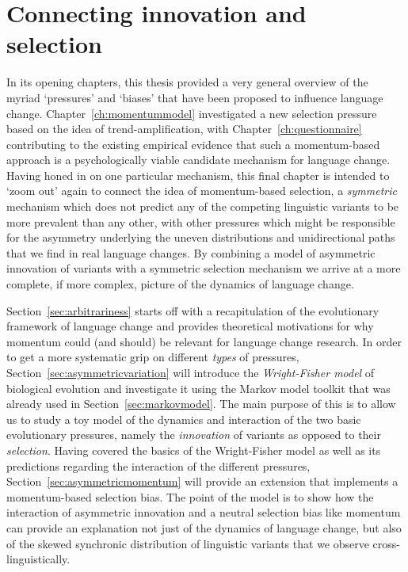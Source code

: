\section{Connecting innovation and selection}

In its opening chapters, this thesis provided a very general overview of the myriad `pressures' and `biases' that have been proposed to influence language change. Chapter~\ref{ch:momentummodel} investigated a new selection pressure based on the idea of trend-amplification, with Chapter~\ref{ch:questionnaire} contributing to the existing empirical evidence that such a momentum-based approach is a psychologically viable candidate mechanism for language change.
Having honed in on one particular mechanism, this final chapter is intended to `zoom out' again to connect the idea of momentum-based selection, a \emph{symmetric} mechanism which does not predict any of the competing linguistic variants to be more prevalent than any other, with other pressures which might be responsible for the asymmetry underlying the uneven distributions and unidirectional paths that we find in real language changes. By combining a model of asymmetric innovation of variants with a symmetric selection mechanism we arrive at a more complete, if more complex, picture of the dynamics of language change.

Section~\ref{sec:arbitrariness} starts off with a recapitulation of the evolutionary framework of language change and provides theoretical motivations for why momentum could (and should) be relevant for language change research.
In order to get a more systematic grip on different \emph{types} of pressures, Section~\ref{sec:asymmetricvariation} will introduce the \emph{Wright-Fisher model} of biological evolution and investigate it using the Markov model toolkit that was already used in Section~\ref{sec:markovmodel}. The main purpose of this is to allow us to study a toy model of the dynamics and interaction of the two basic evolutionary pressures, namely the \emph{innovation} of variants as opposed to their \emph{selection}. Having covered the basics of the Wright-Fisher model as well as its predictions regarding the interaction of the different pressures, Section~\ref{sec:asymmetricmomentum} will provide an extension that implements a momentum-based selection bias. The point of the model is to show how the interaction of asymmetric innovation and a neutral selection bias like momentum can provide an explanation not just of the dynamics of language change, but also of the skewed synchronic distribution of linguistic variants that we observe cross-linguistically.

